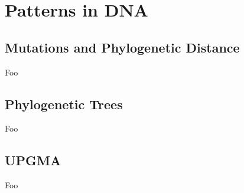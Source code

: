 \section{Patterns in DNA}

\subsection{Mutations and Phylogenetic Distance}

Foo

\subsection{Phylogenetic Trees}

Foo

\subsection{UPGMA}

Foo


